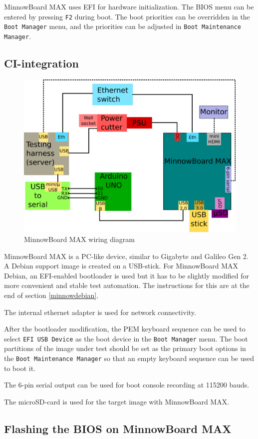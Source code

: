 \documentclass[a4paper,11pt]{article}
\newcommand{\cmd}[1]{\texttt{#1}}
\begin{document}
MinnowBoard MAX uses EFI for hardware initialization. The BIOS menu can be entered by pressing \cmd{F2} during boot. The boot priorities can be overridden in the \cmd{Boot Manager} menu, and the priorities can be adjusted in \cmd{Boot Maintenance Manager}.

\subsection{CI-integration}

\begin{figure}[h]
	\centering
	\includegraphics[width=0.7\linewidth]{minnowwiring.png}
	\caption{MinnowBoard MAX wiring diagram}
	\label{fig:minnowwiring}
\end{figure}

MinnowBoard MAX is a PC-like device, similar to Gigabyte and Galileo Gen 2. A Debian support image is created on a USB-stick. For MinnowBoard MAX Debian, an EFI-enabled bootloader is used but it has to be slightly modified for more convenient and stable test automation. The instructions for this are at the end of section \ref{minnowdebian}.

The internal ethernet adapter is used for network connectivity.

After the bootloader modification, the PEM keyboard sequence can be used to select \cmd{EFI USB Device} as the boot device in the \cmd{Boot Manager} menu. The boot partitions of the image under test should be set as the primary boot options in the \cmd{Boot Maintenance Manager} so that an empty keyboard sequence can be used to boot it.

The 6-pin serial output can be used for boot console recording at 115200 bauds.

The microSD-card is used for the target image with MinnowBoard MAX.

\subsection{Flashing the BIOS on MinnowBoard MAX}
\end{document}
